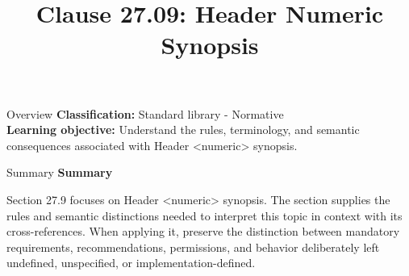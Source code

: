 \documentclass[10pt,letterpaper]{article}
\title{Clause 27.09: Header Numeric Synopsis}
\author{}
\date{}
\begin{document}
\maketitle
\begin{CornellOverviewBox}{Overview}
\textbf{Classification:} Standard library - Normative\\[2pt]
\textbf{Learning objective:} Understand the rules, terminology, and semantic consequences associated with Header <numeric> synopsis.
\end{CornellOverviewBox}\begin{CornellSummaryBox}{Summary}
{\sffamily\bfseries\color{Accent} Summary}\par\vspace{3pt}Section 27.9 focuses on Header <numeric> synopsis. The section supplies the rules and semantic distinctions needed to interpret this topic in context with its cross-references. When applying it, preserve the distinction between mandatory requirements, recommendations, permissions, and behavior deliberately left undefined, unspecified, or implementation-defined.
\end{CornellSummaryBox}
\end{document}
